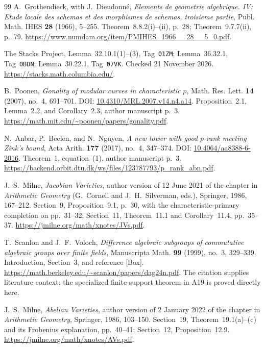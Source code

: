 \documentclass[11pt,a4paper]{article}
\begin{document}
\begin{thebibliography}{99}
A.~Grothendieck, with J.~Dieudonn\'e, \emph{Elements de geometrie
algebrique. IV: Etude locale des schemas et des morphismes de
schemas, troisieme partie}, Publ. Math. IHES \textbf{28} (1966),
5--255. Theorem~8.8.2(i)--(ii), p.~28; Theorem~9.7.7(ii), p.~79.
\url{https://www.numdam.org/item/PMIHES_1966__28__5_0.pdf}.

The Stacks Project, Lemma~32.10.1(1)--(3), Tag~\texttt{01ZM};
Lemma~36.32.1, Tag~\texttt{0BDN}; Lemma~30.22.1,
Tag~\texttt{07VK}. Checked 21 November 2026.
\url{https://stacks.math.columbia.edu/}.

B.~Poonen,
\emph{Gonality of modular curves in characteristic $p$},
Math. Res. Lett. \textbf{14} (2007), no.~4, 691--701.
DOI: \href{https://doi.org/10.4310/MRL.2007.v14.n4.a14}{10.4310/MRL.2007.v14.n4.a14}.
Proposition~2.1, Lemma~2.2, and Corollary~2.3, author manuscript p.~3.
\url{https://math.mit.edu/~poonen/papers/gonality.pdf}.

N.~Anbar, P.~Beelen, and N.~Nguyen,
\emph{A new tower with good $p$-rank meeting Zink's bound},
Acta Arith. \textbf{177} (2017), no.~4, 347--374.
DOI: \href{https://doi.org/10.4064/aa8388-6-2016}{10.4064/aa8388-6-2016}.
Theorem~1, equation~(1), author manuscript p.~3.
\url{https://backend.orbit.dtu.dk/ws/files/123787793/p_rank_abn.pdf}.

J.~S.~Milne, \emph{Jacobian Varieties}, author version of
12 June 2021 of the chapter in \emph{Arithmetic Geometry}
(G.~Cornell and J.~H.~Silverman, eds.), Springer, 1986, 167--212.
Section~9, Proposition~9.1, p.~30, with the characteristic-primary
completion on pp.~31--32; Section~11, Theorem~11.1 and
Corollary~11.4, pp.~35--37.
\url{https://jmilne.org/math/xnotes/JVs.pdf}.

T.~Scanlon and J.~F.~Voloch,
\emph{Difference algebraic subgroups of commutative algebraic
groups over finite fields},
Manuscripta Math. \textbf{99} (1999), no.~3, 329--339.
Introduction, Section~3, and reference \textnormal{[Box]}.
\url{https://math.berkeley.edu/~scanlon/papers/dag24n.pdf}.
The citation supplies literature context; the specialized
finite-support theorem in A19 is proved directly here.


J.~S.~Milne, \emph{Abelian Varieties}, author version of
2 January 2022 of the chapter in \emph{Arithmetic Geometry},
Springer, 1986, 103--150.
Section~19, Theorem~19.1(a)--(c) and its Frobenius explanation,
pp.~40--41; Section~12, Proposition~12.9.
\url{https://jmilne.org/math/xnotes/AVs.pdf}.

\end{thebibliography}
\end{document}
